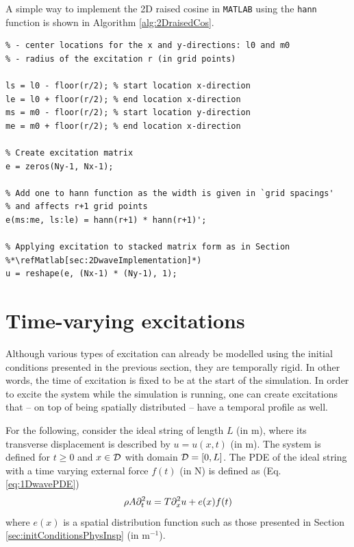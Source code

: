 A simple way to implement the 2D raised cosine in \texttt{MATLAB} using the \texttt{hann} function is shown in Algorithm \ref{alg:2DraisedCos}.
\\
\begin{lstlisting}[caption={A \texttt{MATLAB} implementation of a 2D raised cosine.}, label=alg:2DraisedCos]
% Assuming Dirichlet boundary conditions and having initialised the following
% - center locations for the x and y-directions: l0 and m0
% - radius of the excitation r (in grid points)

ls = l0 - floor(r/2); % start location x-direction
le = l0 + floor(r/2); % end location x-direction
ms = m0 - floor(r/2); % start location y-direction
me = m0 + floor(r/2); % end location x-direction

% Create excitation matrix
e = zeros(Ny-1, Nx-1);

% Add one to hann function as the width is given in `grid spacings'
% and affects r+1 grid points
e(ms:me, ls:le) = hann(r+1) * hann(r+1)';

% Applying excitation to stacked matrix form as in Section %*\refMatlab[sec:2DwaveImplementation]*)
u = reshape(e, (Nx-1) * (Ny-1), 1);
\end{lstlisting} 

\section{Time-varying excitations}
Although various types of excitation can already be modelled using the initial conditions presented in the previous section, they are temporally rigid. In other words, the time of excitation is fixed to be at the start of the simulation. In order to excite the system while the simulation is running, one can create excitations that -- on top of being spatially distributed -- have a temporal profile as well.

For the following, consider the ideal string of length $L$ (in m), where its transverse displacement is described by $u = u(x,t)$ (in m). The system is defined for $t\geq 0$ and $x\in\mathcal{D}$ with domain $\mathcal{D} = [0, L]$. The PDE of the ideal string with a time varying external force $f(t)$ (in N) is defined as (Eq. \eqref{eq:1DwavePDE})
\begin{equation}
    \rho A\partial_t^2 u = T \partial_x^2 u + e(x)f(t)
\end{equation}
where $e(x)$ is a spatial distribution function such as those presented in Section \ref{sec:initConditionsPhysInsp} (in m$^{-1}$).

